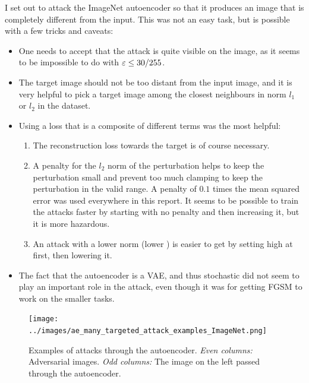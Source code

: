 \documentclass[]{scrarticle}
\begin{document}
I set out to attack the ImageNet autoencoder
so that it produces an image that is completely different from the input.
This was not an easy task, but is possible with a few tricks and caveats:
\begin{itemize}
  \item One needs to accept that the attack is quite visible on the image,
    as it seems to be impossible to do with $\varepsilon \leq 30 / 255$.
  \item The target image should not be too distant from the input image,
    and it is very helpful to pick a target image among the closest neighbours
    in norm $l_1$ or $l_2$ in the dataset.
  \item Using a loss that is a composite of different terms was the most helpful:
    \begin{enumerate}
      \item The reconstruction loss towards the target is of course necessary.
      \item A penalty for the $l_2$ norm of the perturbation helps to keep the
        perturbation small and prevent too much clamping to keep the perturbation
        in the valid range. A penalty of $0.1$ times the mean squared error was used
        everywhere in this report. It seems to be possible to train the attacks faster by
        starting with no penalty and then increasing it, but it is more hazardous.
      \item An attack with a lower norm (lower \e) is easier to get by setting \e high at first,
        then lowering it.
    \end{enumerate}
  \item The fact that the autoencoder is a VAE, and thus stochastic did not seem to
    play an important role in the attack, even though it was for getting FGSM to work on
    the smaller tasks.
\end{itemize}

\begin{figure}[h]
  \centering
  \texttt{[image: ../images/ae\_many\_targeted\_attack\_examples\_ImageNet.png]}
  \caption{
    Examples of attacks through the autoencoder.
    \emph{Even columns:} Adversarial images.
    \emph{Odd columns:} The image on the left passed through the autoencoder.
  }
  \label{fig:ae_targeted_attack_example2}
\end{figure}
\end{document}
